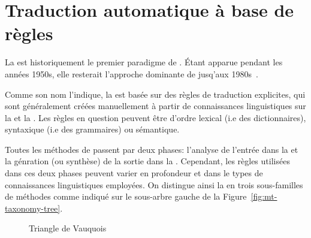 \section{Traduction automatique à base de règles}
\label{sec:rbmt}

La  est historiquement le premier paradigme de . 
Étant apparue pendant les années 1950s, 
elle resterait l'approche dominante de  jusq'aux 1980s~\cite{routledge}.

Comme son nom l'indique, la  est basée sur des règles de traduction explicites,
qui sont généralement créées manuellement à partir de connaissances linguistiques sur la  et la . 
Les règles en question peuvent être d'ordre lexical (i.e des dictionnaires),
syntaxique (i.e des grammaires) ou sémantique.

Toutes les méthodes de  passent par deux phases: 
l'analyse de l'entrée dans la  
et la génration (ou synthèse) de la sortie dans la . 
Cependant, les règles utilisées dans ces deux phases peuvent varier en profondeur
et dans le types de connaissances linguistiques employées. 
On distingue ainsi la  en trois sous-familles de méthodes comme indiqué 
sur le sous-arbre gauche de la Figure~\ref{fig:mt-taxonomy-tree}.

\begin{figure}[h]
    \begin{center}
        
    \end{center}
    \caption{Triangle de Vauquois}
    \label{fig:vauquois-triangle}
\end{figure}


